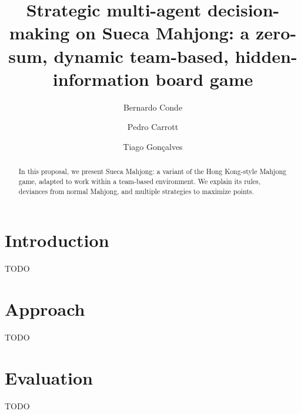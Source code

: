 \documentclass{acmart}
\begin{document}
\title{Strategic multi-agent decision-making on Sueca Mahjong: a zero-sum, dynamic team-based, hidden-information board game}

\author{Bernardo Conde}
\author{Pedro Carrott}
\author{Tiago Gonçalves}

\renewcommand{\shortauthors}{Conde, Carrott and Gonçalves}

\begin{abstract}
  In this proposal, we present Sueca Mahjong: a variant of the Hong Kong-style
  Mahjong game, adapted to work within a team-based environment. We explain its rules,
  deviances from normal Mahjong, and multiple strategies to maximize points.
\end{abstract}


\maketitle

\section{Introduction}
TODO

\section{Approach}
TODO

\section{Evaluation}
TODO
\end{document}
